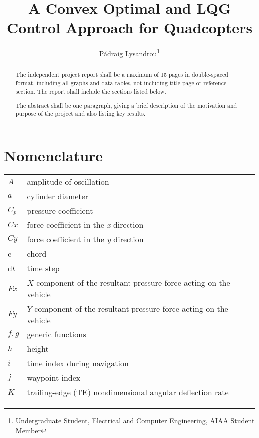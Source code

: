 \documentclass[conf]{new-aiaa}
\title{A Convex Optimal and LQG Control Approach for Quadcopters}
\author{Pádraig Lysandrou\footnote{Undergraduate Student, Electrical and Computer Engineering, AIAA Student Member}} \affil{Cornell University, Ithaca, New York, 14853}
\begin{document}
\maketitle

\begin{abstract}
The independent project report shall be a maximum of 15 pages in double-spaced format,
including all graphs and data tables, not including title page or reference section. The report shall
include the sections listed below.

The abstract shall be one paragraph, giving a brief description of the motivation and purpose of the project and also listing key results.\end{abstract}

\section*{Nomenclature}

{\renewcommand\arraystretch{1.0}
\noindent\begin{longtable*}{@{}l @{\quad=\quad} l@{}}
$A$  & amplitude of oscillation \\
$a$ &    cylinder diameter \\
$C_p$& pressure coefficient \\
$Cx$ & force coefficient in the \textit{x} direction \\
$Cy$ & force coefficient in the \textit{y} direction \\
c   & chord \\
d$t$ & time step \\
$Fx$ & $X$ component of the resultant pressure force acting on the vehicle \\
$Fy$ & $Y$ component of the resultant pressure force acting on the vehicle \\
$f, g$   & generic functions \\
$h$  & height \\
$i$  & time index during navigation \\
$j$  & waypoint index \\
$K$  & trailing-edge (TE) nondimensional angular deflection rate
\end{longtable*}}
\end{document}
